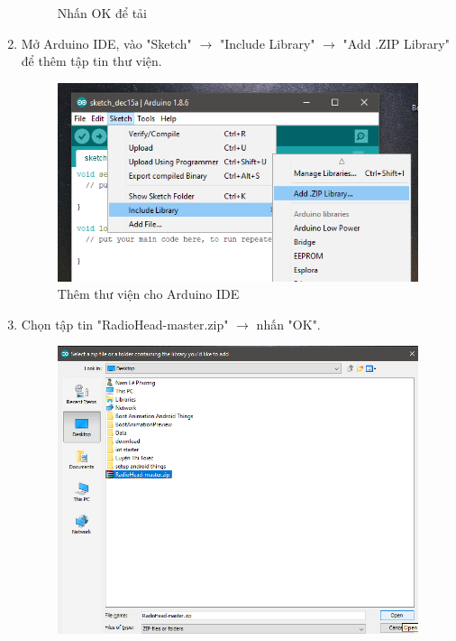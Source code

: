 \begin{enumerate}
\begin{center}
\begin{figure}[htp]
\begin{center}
\end{center}
\caption{Nhấn OK để tải}
\end{figure}
\end{center}
\item Mở Arduino IDE, vào "Sketch" $\rightarrow$ "Include Library" $\rightarrow$ "Add .ZIP Library" để thêm tập tin thư viện.
\begin{center}
\begin{figure}[htp]
\begin{center}
\includegraphics[scale=0.75]{image4/arduino10.png}
\end{center}
\caption{Thêm thư viện cho Arduino IDE}
\end{figure}
\end{center}
\item Chọn tập tin "RadioHead-master.zip" $\rightarrow$ nhấn "OK".
\begin{center}
\begin{figure}[htp]
\begin{center}
\includegraphics[scale=0.515]{image4/arduino11.png}

\end{center}
\end{figure}
\end{center}
\end{enumerate}
